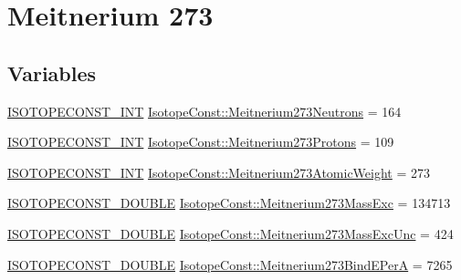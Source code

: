 \hypertarget{group___isotope_const-_meitnerium-_mt273}{}\section{Meitnerium 273}
\label{group___isotope_const-_meitnerium-_mt273}
\subsection*{Variables}
\begin{DoxyCompactItemize}
\item 
\mbox{\hyperlink{group___isotope_const-_macros_ga5f18360b3e99483a35c32d789e62621c}{I\+S\+O\+T\+O\+P\+E\+C\+O\+N\+S\+T\+\_\+\+I\+NT}} \mbox{\hyperlink{group___isotope_const-_meitnerium-_mt273_gaf8c40d59e96671fcfe4574fe78bfaa36}{Isotope\+Const\+::\+Meitnerium273\+Neutrons}} = 164
\item 
\mbox{\hyperlink{group___isotope_const-_macros_ga5f18360b3e99483a35c32d789e62621c}{I\+S\+O\+T\+O\+P\+E\+C\+O\+N\+S\+T\+\_\+\+I\+NT}} \mbox{\hyperlink{group___isotope_const-_meitnerium-_mt273_ga98c806a37e8fb0ebc63428be95aabe04}{Isotope\+Const\+::\+Meitnerium273\+Protons}} = 109
\item 
\mbox{\hyperlink{group___isotope_const-_macros_ga5f18360b3e99483a35c32d789e62621c}{I\+S\+O\+T\+O\+P\+E\+C\+O\+N\+S\+T\+\_\+\+I\+NT}} \mbox{\hyperlink{group___isotope_const-_meitnerium-_mt273_gabcf0095846e27501d31c9f65f8eeb3aa}{Isotope\+Const\+::\+Meitnerium273\+Atomic\+Weight}} = 273
\item 
\mbox{\hyperlink{group___isotope_const-_macros_ga8f45a7272ce02c0b4c65c44636ed719a}{I\+S\+O\+T\+O\+P\+E\+C\+O\+N\+S\+T\+\_\+\+D\+O\+U\+B\+LE}} \mbox{\hyperlink{group___isotope_const-_meitnerium-_mt273_gac78a81b1bf4133362c90c18469fe9b1c}{Isotope\+Const\+::\+Meitnerium273\+Mass\+Exc}} = 134713
\item 
\mbox{\hyperlink{group___isotope_const-_macros_ga8f45a7272ce02c0b4c65c44636ed719a}{I\+S\+O\+T\+O\+P\+E\+C\+O\+N\+S\+T\+\_\+\+D\+O\+U\+B\+LE}} \mbox{\hyperlink{group___isotope_const-_meitnerium-_mt273_ga3aca66f3e64c1a3d131d84e96a860e5e}{Isotope\+Const\+::\+Meitnerium273\+Mass\+Exc\+Unc}} = 424
\item 
\mbox{\hyperlink{group___isotope_const-_macros_ga8f45a7272ce02c0b4c65c44636ed719a}{I\+S\+O\+T\+O\+P\+E\+C\+O\+N\+S\+T\+\_\+\+D\+O\+U\+B\+LE}} \mbox{\hyperlink{group___isotope_const-_meitnerium-_mt273_gaf07b9c5526109ce1093b16d0dff30464}{Isotope\+Const\+::\+Meitnerium273\+Bind\+E\+PerA}} = 7265
\item 

\end{DoxyCompactItemize}
